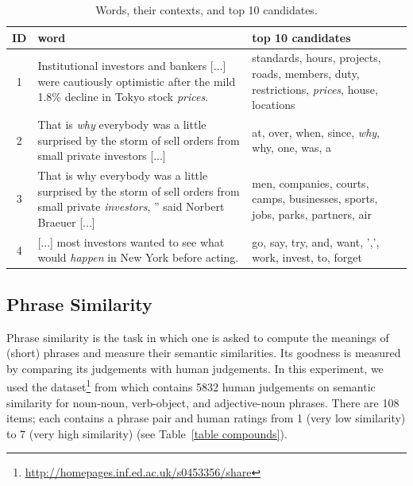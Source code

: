 \documentclass[11pt]{article}
\begin{document}
\begin{table}[!ht]
	\center
	\begin{tabular}{c|p{9cm}|p{6cm}}
		ID & word & top 10 candidates \\ \hline
		
		1 & Institutional investors and bankers [...] were cautiously optimistic after the mild 1.8\% decline in Tokyo stock \textit{prices}. & standards, hours, projects, roads,  members, duty, restrictions, \textit{prices}, house, locations \\ \hline
		
		2 & That is \textit{why} everybody was a little surprised by the storm of sell orders from small private investors [...] & at, over, when, since, \textit{why}, why, one, was, a \\ \hline

		3 & That is why everybody was a little surprised by the storm of sell orders from small private \textit{investors}, '' said Norbert Braeuer [...] & men, companies, courts, camps, businesses, sports, jobs, parks, partners, air \\ \hline
	
		4 & [...] most investors wanted to see what would \textit{happen} in New York before acting. &  go, say, try, and, want, ',', work, invest, to, forget 
	
	\end{tabular}
	\caption{Words, their contexts, and top 10 candidates.}
	\label{table top 10}
\end{table}



	
\subsection{Phrase Similarity}
\label{subsection phrase similarity}

Phrase similarity is the task in which one is asked to compute the meanings of (short) phrases 
and measure their semantic similarities. Its goodness is measured by comparing its judgements with 
human judgements. In this experiment, we used the dataset\footnote{\url{http://homepages.inf.ed.ac.uk/s0453356/share}} from 
\cite{mitchell_composition_2010} which contains 5832 human judgements on semantic similarity 
for noun-noun, verb-object, and adjective-noun phrases. There are 108 items; each contains a phrase pair
and human ratings from 1 (very low similarity) to 7 (very high similarity) (see Table~\ref{table compounds}).
\end{document}
